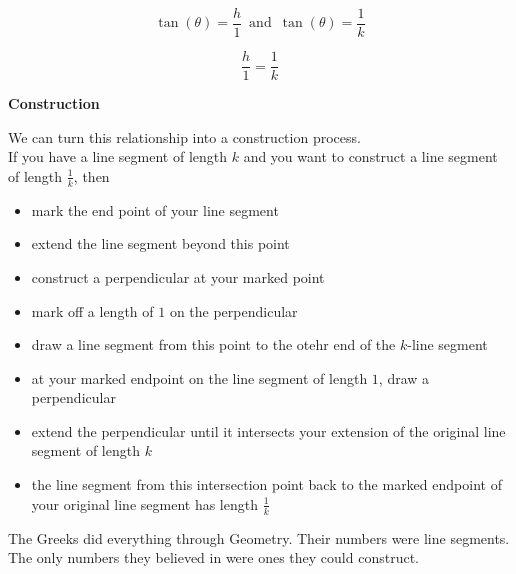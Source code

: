 \documentclass{ximera}
\begin{document}
\begin{image}
\end{image}



\[
\tan(\theta) = \frac{h}{1}  \, \text{ and } \,  \tan(\theta) = \frac{1}{k}
\]


\[
 \frac{h}{1}  = \frac{1}{k}
\]







\textbf{\textcolor{red!80!black}{Construction}}


We can turn this relationship into a construction process. \\



If you have a line segment of length $k$ and you want to construct a line segment of length $\frac{1}{k}$, then


\begin{itemize}
\item mark the end point of your line segment
\item extend the line segment beyond this point
\item construct a perpendicular at your marked point
\item mark off a length of $1$ on the perpendicular
\item draw a line segment from this point to the otehr end of the $k$-line segment
\item at your marked endpoint on the line segment of length $1$, draw a perpendicular
\item extend the perpendicular until it intersects your extension of the original line segment of length $k$
\item the line segment from this intersection point back to the marked endpoint of your original line segment has length $\frac{1}{k}$
\end{itemize}


The Greeks did everything through Geometry.  Their numbers were line segments.  The only numbers they believed in were ones they could construct.
\end{document}
